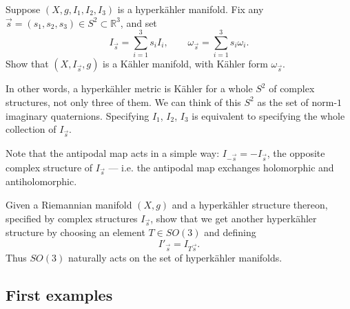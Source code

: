 \documentclass[12pt,letterpaper,reqno]{article}
\numberwithin{equation}{section}
\newcommand{\R}{\ensuremath{\mathbb R}}
\newcommand{\kahler}{K\"ahler\xspace}
\newcommand{\hk}{hyperk\"ahler\xspace}
\begin{document}
\begin{exercise}
Suppose $(X,g,I_1,I_2,I_3)$ is a \hk manifold. Fix any $\vec s = (s_1,s_2,s_3) \in S^2 \subset \R^3$, and set
\begin{equation}
  I_{\vec s} = \sum_{i=1}^3 s_i I_i, \qquad \omega_{\vec s} = \sum_{i=1}^3 s_i \omega_i.
\end{equation}
Show that $(X,I_{\vec s},g)$ is a \kahler manifold,
with \kahler form $\omega_{\vec s}$.
\end{exercise}
In other words, a \hk metric is \kahler for a whole 
$S^2$ of complex structures, not only three of them.
We can think of this $S^2$ as the
set of norm-$1$ imaginary quaternions.
Specifying $I_1$, $I_2$, $I_3$ is equivalent to 
specifying the whole collection of $I_{\vec s}$.

Note that the antipodal map acts in a simple way:
$I_{-\vec s} = - I_{\vec s}$, the opposite
complex structure of $I_{\vec s}$ --- i.e. 
the antipodal map exchanges holomorphic and antiholomorphic.

\begin{exercise}
Given a Riemannian manifold $(X,g)$ and 
a \hk structure thereon, specified by complex structures
$I_{\vec s}$, show that we get another
\hk structure by choosing an element $T \in SO(3)$
and defining 
\begin{equation}
I'_{\vec s} = I_{T \vec s}.
\end{equation}
Thus $SO(3)$ naturally acts on the set of
\hk manifolds.
\end{exercise}


\subsection{First examples}
\end{document}
